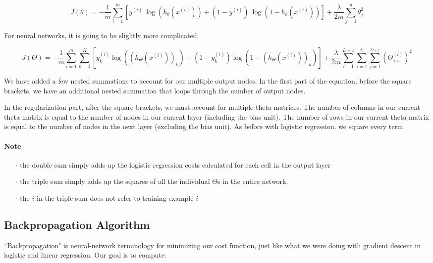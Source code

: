 \documentclass[UTF8]{article}
\begin{document}
\[J(\theta) = - \frac{1}{m} \sum_{i=1}^m [ y^{(i)}\ \log (h_\theta (x^{(i)})) + (1 - y^{(i)})\ \log (1 - h_\theta(x^{(i)}))] + \frac{\lambda}{2m}\sum_{j=1}^n \theta_j^2\]

For neural networks, it is going to be slightly more complicated:

\[J(\Theta) = - \frac{1}{m} \sum_{i=1}^m \sum_{k=1}^K \left[y^{(i)}_k \log ((h_\Theta (x^{(i)}))_k) + (1 - y^{(i)}_k)\log (1 - (h_\Theta(x^{(i)}))_k)\right] + \frac{\lambda}{2m}\sum_{l=1}^{L-1} \sum_{i=1}^{s_l} \sum_{j=1}^{s_{l+1}} ( \Theta_{j,i}^{(l)})^2\]

We have added a few nested summations to account for our multiple output nodes. In the first part of the equation, before the square brackets, we have an additional nested summation that loops through the number of output nodes.

In the regularization part, after the square brackets, we must account for multiple theta matrices. The number of columns in our current theta matrix is equal to the number of nodes in our current layer (including the bias unit). The number of rows in our current theta matrix is equal to the number of nodes in the next layer (excluding the bias unit). As before with logistic regression, we square every term.

\paragraph{Note}

\begin{itemize}
\item[$\cdot$]the double sum simply adds up the logistic regression costs calculated for each cell in the output layer
\item[$\cdot$]the triple sum simply adds up the squares of all the individual $\Theta$s in the entire network.
\item[$\cdot$]the $i$ in the triple sum does not refer to training example $i$
\end{itemize}

\subsection{Backpropagation Algorithm}

``Backpropagation" is neural-network terminology for minimizing our cost function, just like what we were doing with gradient descent in logistic and linear regression. Our goal is to compute:
\end{document}

